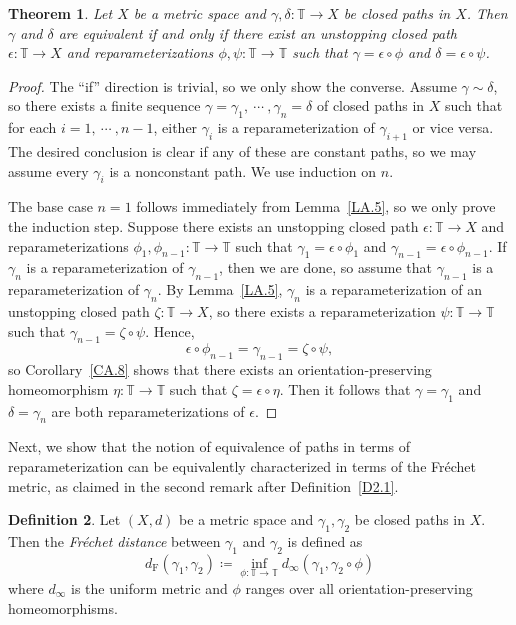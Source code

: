 \documentclass[reqno,centertags,12pt]{amsart}
\newtheorem{theorem}{Theorem}[section]
\theoremstyle{definition}
\newtheorem{definition}[theorem]{Definition}
\numberwithin{equation}{section}
\newcommand{\bbT}{{\mathbb{T}}}
\begin{document}
\begin{theorem}\label{TA.9}
	Let $X$ be a metric space and $\gamma,\delta\colon\bbT\to X$ be
	closed paths in $X$. Then $\gamma$ and $\delta$ are equivalent if and only if
	there exist an unstopping closed path $\epsilon\colon\bbT\to X$ and reparameterizations
	$\phi,\psi\colon\bbT\to\bbT$ such that
	$\gamma = \epsilon\circ\phi$ and $\delta = \epsilon\circ\psi$.
\end{theorem}

\begin{proof}
	The ``if'' direction is trivial, so we only show the converse. Assume $\gamma\sim \delta$,
	so there exists a finite sequence $\gamma=\gamma_{1},\ \cdots\ ,\gamma_{n}=\delta$
	of closed paths in $X$ such that for each $i=1,\ \cdots\ ,n-1$, either $\gamma_{i}$ is a
	reparameterization of $\gamma_{i+1}$ or vice versa. The desired conclusion is clear
	if any of these are constant paths, so we may assume every
	$\gamma_{i}$ is a nonconstant path. We use induction on $n$.

	The base case $n=1$ follows immediately from
	Lemma~\ref{LA.5}, so we only prove
	the induction step. Suppose there exists an unstopping closed path
	$\epsilon\colon\bbT\to X$ and reparameterizations $\phi_{1},\phi_{n-1}\colon\bbT\to\bbT$
	such that $\gamma_{1}=\epsilon\circ\phi_{1}$ and $\gamma_{n-1}=\epsilon\circ\phi_{n-1}$.
	If $\gamma_{n}$ is a reparameterization of $\gamma_{n-1}$, then we are done, so
	assume that $\gamma_{n-1}$ is a reparameterization of $\gamma_{n}$.
	By Lemma~\ref{LA.5}, $\gamma_{n}$ is a
	reparameterization of an unstopping closed path $\zeta\colon\bbT\to X$, so there exists
	a reparameterization $\psi\colon\bbT\to\bbT$ such that
	$\gamma_{n-1} = \zeta\circ\psi$. Hence,
	\[
		\epsilon\circ\phi_{n-1} = \gamma_{n-1} = \zeta\circ\psi,
	\]
	so Corollary~\ref{CA.8} shows that
	there exists an orientation-preserving homeomorphism $\eta\colon\bbT\to\bbT$
	such that $\zeta = \epsilon\circ\eta$. Then it follows that
	$\gamma=\gamma_{1}$ and $\delta=\gamma_{n}$ are both reparameterizations of $\epsilon$.
\end{proof}

Next, we show that the notion of equivalence of paths in terms of reparameterization
can be equivalently characterized in terms of the Fr\'{e}chet metric, as claimed in
the second remark after Definition~\ref{D2.1}.

\begin{definition}
	Let $(X,d)$ be a metric space and $\gamma_{1},\gamma_{2}$ be closed paths in $X$.
	Then the \emph{Fr\'{e}chet distance} between $\gamma_{1}$ and $\gamma_{2}$ is defined as
    \[
        d_{\mathrm{F}}(\gamma_{1},\gamma_{2})\coloneqq
        \inf_{\phi\colon\bbT\to\bbT}d_{\infty}(\gamma_{1}, \gamma_{2}\circ\phi)
    \]
    where $d_{\infty}$ is the uniform metric and $\phi$ ranges over all
    orientation-preserving homeomorphisms.
\end{definition}
\end{document}
